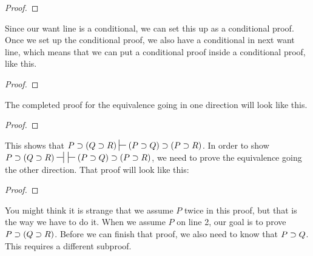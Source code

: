 {\begin{proof}
	
\end{proof}

Since our want line is a conditional, we can set this up as a conditional proof. Once we set up the conditional proof, we also have a conditional in next want line, which means that we can put a conditional proof inside a conditional proof, like this.

\begin{proof}
	
	\open
		
		\open
			
\end{proof}

The completed proof for the equivalence going in one direction will look like this.

\begin{proof}
	
	\open
		
		\open
			
		 
			
		 
		\close
	 
	\close
{} 
\end{proof}

This shows that $P \eif (Q \eif R) \sststile{}{} (P \eif Q) \eif (P \eif R)$. In order to show $P \eif (Q \eif R) \nsststile{}{} \hspace{.5em} \sststile{}{} (P \eif Q) \eif (P \eif R)$, we need to prove the equivalence going the other direction. That proof will look like this:

\begin{proof}
	
	\open
	 
		\open
		 
			\open
			 
			 
			\close
		 
		 
		 
		\close	
{} 
\close
{} 
\end{proof}
You might think it is strange that we assume $P$ twice in this proof, but that is the way we have to do it. When we assume $P$ on line 2, our goal is to prove $P \supset (Q \supset R)$. Before we can finish that proof, we also need to know that $P \supset Q$. This requires a different subproof. 

}
